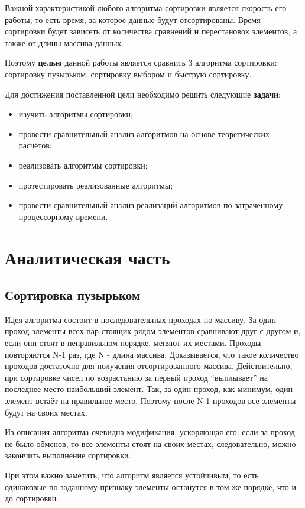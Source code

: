 \documentclass{report}
\begin{document}
Важной характеристикой любого алгоритма сортировки является скорость его работы, то есть время, за которое данные будут отсортированы. Время сортировки будет зависеть от количества сравнений и перестановок элементов, а также от длины массива данных. 

Поэтому \textbf{целью} данной работы является сравнить 3 алгоритма сортировки: сортировку пузырьком, сортировку выбором и быструю сортировку. 

Для достижения поставленной цели необходимо решить следующие \textbf{задачи}:
\begin{itemize}
\item изучить алгоритмы сортировки;
\item провести сравнительный анализ алгоритмов на основе теоретических расчётов;
\item реализовать алгоритмы сортировки;
\item протестировать реализованные алгоритмы;
\item провести сравнительный анализ реализаций алгоритмов по затраченному процессорному времени.
\end{itemize}


\chapter{Аналитическая часть}

\section{Сортировка пузырьком}

Идея алгоритма состоит в последовательных проходах по массиву. За один проход элементы всех пар стоящих рядом элементов сравнивают друг с другом и, если они стоят в неправильном порядке, меняют их местами. Проходы повторяются N-1 раз, где N - длина массива. Доказывается, что такое количество проходов достаточно для получения отсортированного массива. Действительно, при сортировке чисел по возрастанию за первый проход ``выплывает'' на последнее место наибольший элемент. Так, за один проход, как минимум, один элемент встаёт на правильное место. Поэтому после N-1 проходов все элементы будут на своих местах. 

Из описания алгоритма очевидна модификация, ускоряющая его: если за проход не было обменов, то все элементы стоят на своих местах, следовательно, можно закончить выполнение сортировки. 

При этом важно заметить, что алгоритм является устойчивым, то есть одинаковые по заданному признаку элементы останутся в том же порядке, что и до сортировки.
\end{document}
